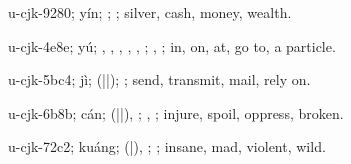\begin{multicols}{2}
{\cjkgGlue{}u-cjk-9280; yín; \cjkgGlue{}; \cjkgGlue{}; silver, cash, money, wealth.

\cjkgGlue{}u-cjk-4e8e; yú; \cjkgGlue{}, \cjkgGlue{}, \cjkgGlue{}, \cjkgGlue{}, \cjkgGlue{}, \cjkgGlue{}; \cjkgGlue{}, \cjkgGlue{}; in, on, at, go to, a particle.

\cjkgGlue{}u-cjk-5bc4; jì; \cjkgGlue{}\cjkgGlue{}(\cjkgGlue{}|\cjkgGlue{}|\cjkgGlue{}); \cjkgGlue{}; send, transmit, mail, rely on.

\cjkgGlue{}u-cjk-6b8b; cán; \cjkgGlue{}\cjkgGlue{}(\cjkgGlue{}|\cjkgGlue{}|\cjkgGlue{}), \cjkgGlue{}\cjkgGlue{}\cjkgGlue{}; \cjkgGlue{}, \cjkgGlue{}; injure, spoil, oppress, broken.

\cjkgGlue{}u-cjk-72c2; kuáng; \cjkgGlue{}\cjkgGlue{}(\cjkgGlue{}|\cjkgGlue{}), \cjkgGlue{}\cjkgGlue{}\cjkgGlue{}; \cjkgGlue{}; insane, mad, violent, wild.

}
\end{multicols}
